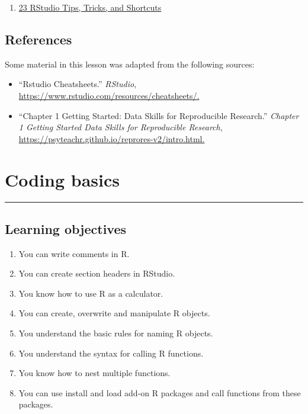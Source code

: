 \documentclass[
  letterpaper,
  DIV=11,
  numbers=noendperiod]{scrreprt}
\providecommand{\tightlist}{%
  \setlength{\itemsep}{0pt}\setlength{\parskip}{0pt}}\usepackage{longtable,booktabs,array}
\begin{document}
\begin{enumerate}
\def\labelenumi{\arabic{enumi}.}
\tightlist
\item
  \href{https://www.dataquest.io/blog/rstudio-tips-tricks-shortcuts/}{23
  RStudio Tips, Tricks, and Shortcuts}
\end{enumerate}

\section{References}\label{references-1}

Some material in this lesson was adapted from the following sources:

\begin{itemize}
\tightlist
\item
  ``Rstudio Cheatsheets.'' \emph{RStudio},
  \url{https://www.rstudio.com/resources/cheatsheets/.}
\item
  ``Chapter 1 Getting Started: Data Skills for Reproducible Research.''
  \emph{Chapter 1 Getting Started \textbar{} Data Skills for
  Reproducible Research},
  \url{https://psyteachr.github.io/reprores-v2/intro.html.}
\end{itemize}

\chapter{Coding basics}\label{coding-basics}

\begin{center}\rule{0.5\linewidth}{0.5pt}\end{center}

\section*{Learning objectives}\label{learning-objectives-1}


\begin{enumerate}
\def\labelenumi{\arabic{enumi}.}
\item
  You can write comments in R.
\item
  You can create section headers in RStudio.
\item
  You know how to use R as a calculator.
\item
  You can create, overwrite and manipulate R objects.
\item
  You understand the basic rules for naming R objects.
\item
  You understand the syntax for calling R functions.
\item
  You know how to nest multiple functions.
\item
  You can use install and load add-on R packages and call functions from
  these packages.
\end{enumerate}
\end{document}
